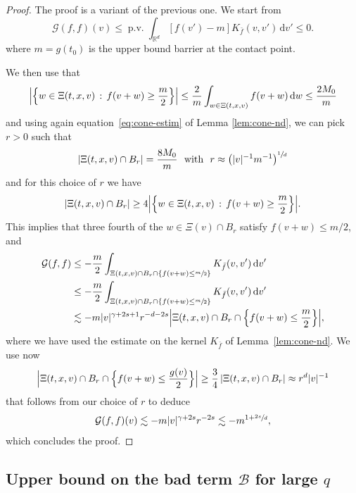 \documentclass[11pt]{article}
\theoremstyle{plain}
\theoremstyle{definition}
\numberwithin{equation}{section}
\newcommand{\R}{\mathbb R}
\newcommand{\dd} {\, \mathrm{d}}
\DeclareMathOperator{\PV}{p.v.}
\begin{document}
\begin{proof}
The proof is a variant of the previous one. We start from
\begin{equation*}
\mathcal{G}(f,f)(v) \le \PV \int_{\R^d} \left[f(v')-m\right] K_{\bar f}(v,v') \dd
v' \le 0.
\end{equation*}
where $m=g(t_0)$ is the upper bound barrier at the contact point.

We then use that
\[
\Bigl|\Bigl\{ w \in \Xi(t,x,v) \, : \, f(v+w) \ge \frac{m}{2}
\Bigr\}\Bigr| \le \frac2{m} \int_{w \in \Xi(t,x,v)} f(v+w) \dd w \le
\frac{2M_0}{m}
\]
and using again equation~\eqref{eq:cone-estim} of Lemma
\ref{lem:cone-nd}, we can pick $r>0$ such that
\[
\left|\Xi(t,x,v) \cap B_r \right| = \frac{8M_0}{m} \ \mbox{ with } \ r \approx
\left(|v|^{-1} m^{-1}\right)^{\sfrac1d}
\]
and for this choice of $r$ we have
\[
\left|\Xi(t,x,v) \cap B_r \right| \ge 4 \Bigl|\Bigl\{ w \in \Xi(t,x,v) \, :
\, f(v+w) \ge \frac{m}{2} \Bigr\}\Bigr|.
\]
This implies that three fourth of the $w \in \Xi(v) \cap B_r$ satisfy
$ f(v+w) \le m/2$, and
\begin{align*}
\mathcal G(f,f) & \leq - \frac{m}{2} \int_{\Xi(t,x,v) \cap B_r \cap \left\{f(v+w) \le \sfrac{m}{2}\right\}}
K_{\bar f}(v,v') \dd v' \\
&\leq -\frac{m}{2} \int_{\Xi(t,x,v) \cap B_r \cap \left\{f(v+w) \le \sfrac{m}{2}\right\} } K_{\bar f}(v,v') \dd v' \\
&\lesssim - m |v|^{\gamma+2s+1} r^{-d-2s} \Bigl|\Xi(t,x,v) \cap B_r \cap
\Bigl\{f(v+w) \le \frac{m}{2}\Bigr\}\Bigr|,
\end{align*}
where we have used the estimate on the kernel $K_{\bar f}$ of
Lemma~\ref{lem:cone-nd}. We use now
\[
\Bigl|\Xi(t,x,v) \cap B_r \cap \Bigl\{f(v+w) \le \frac{g(v)}{2} \Bigr\}\Bigr| \ge \frac34\, |\Xi(t,x,v) \cap
B_r| \approx r^d |v|^{-1}
\]
that follows from our choice of $r$ to deduce
\begin{align*}
\mathcal G(f,f)(v) \lesssim - m |v|^{\gamma+2s} r^{-2s} \lesssim
- m^{1+\sfrac{2s}{d}},
\end{align*}
which concludes the proof.
\end{proof}

\subsection{Upper bound on the bad term $\mathcal B$ for large $q$}
\end{document}
